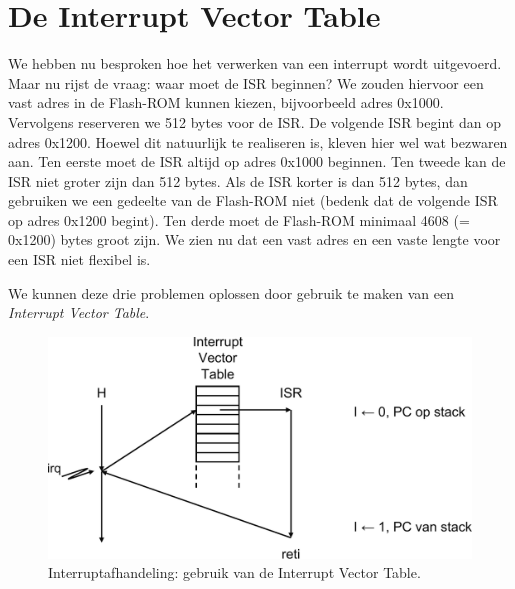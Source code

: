 \section{De Interrupt Vector Table}
We hebben nu besproken hoe het verwerken van een interrupt wordt uitgevoerd.
Maar nu rijst de vraag: waar moet de ISR beginnen? We zouden hiervoor een
vast adres in de Flash-ROM kunnen kiezen, bijvoorbeeld adres 0x1000.
Vervolgens reserveren we 512 bytes voor de ISR. De volgende ISR begint dan
op adres 0x1200. Hoewel dit natuurlijk te realiseren is, kleven hier wel
wat bezwaren aan. Ten eerste moet de ISR altijd op adres 0x1000 beginnen.
Ten tweede kan de ISR niet groter zijn dan 512 bytes. Als de ISR korter is
dan 512 bytes, dan gebruiken we een gedeelte van de Flash-ROM niet (bedenk
dat de volgende ISR op adres 0x1200 begint). Ten derde moet de Flash-ROM
minimaal 4608 (= 0x1200) bytes groot zijn. We zien nu dat een vast adres
en een vaste lengte voor een ISR niet flexibel is.

We kunnen deze drie problemen oplossen door gebruik te maken van een
\textsl{Interrupt Vector Table}.






\begin{figure}[!ht]
\centering
\includegraphics[scale=\figscale]{images/intinterruptdispatchwithvectortable}
\caption{Interruptafhandeling: gebruik van de Interrupt Vector Table.}
\label{fig:intinterruptdispatchwithvectortable}
\end{figure}



